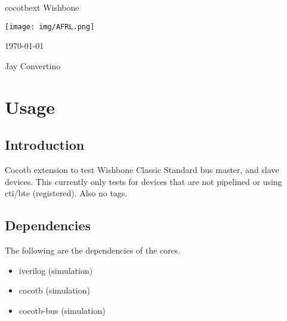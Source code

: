 \begin{titlepage}
  \begin{center}

  {\Huge cocotbext Wishbone}

  \vspace{25mm}

  \texttt{[image: img/AFRL.png]}

  \vspace{25mm}

  \today

  \vspace{15mm}

  {\Large Jay Convertino}

  \end{center}
\end{titlepage}

\tableofcontents

\newpage

\section{Usage}

\subsection{Introduction}

\par
Cocotb extension to test Wishbone Classic Standard bus master, and slave devices.
This currently only tests for devices that are not pipelined or using cti/bte (registered). Also no tags.

\subsection{Dependencies}

\par
The following are the dependencies of the cores.

\begin{itemize}
  \item iverilog (simulation)
  \item cocotb (simulation)
  \item cocotb-bus (simulation)
\end{itemize}

